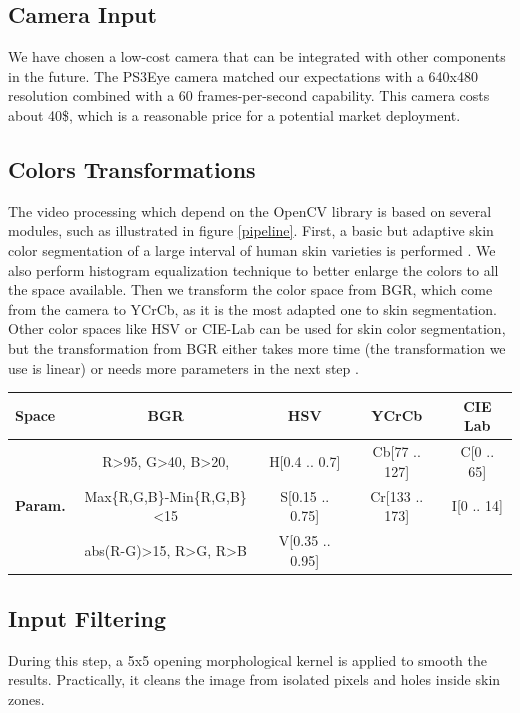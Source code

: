 \documentclass{llncs}
\begin{document}
\subsection{Camera Input}
We have chosen a low-cost camera that can be integrated with other components in the future.
The PS3Eye camera matched our expectations with a 640x480 resolution combined with a 60 frames-per-second capability.
This camera costs about 40\$, which is a reasonable price for a potential market deployment.

\subsection{Colors Transformations} %
The video processing which depend on the OpenCV library \cite{openCVlib} is based on several modules, such as illustrated in figure \ref{pipeline}.
First, a basic but adaptive skin color segmentation of a large interval of human skin varieties is performed \cite{skinColorSeg}.
We also perform histogram equalization technique to better enlarge the colors to all the space available.
Then we transform the color space from BGR, which come from the camera to YCrCb,
as it is the most adapted one to skin segmentation. Other color spaces like HSV or CIE-Lab can be used for skin color segmentation,
but the transformation from BGR either takes more time (the transformation we use is linear) or needs more parameters
in the next step \cite{skinColorSeg}.


\begin{center}
\begin{tabular}{|l|c|c|c|c|}
\hline
\textbf{Space} & BGR & HSV & YCrCb & CIE Lab\\
\hline
 & R\textgreater 95, G\textgreater 40, B\textgreater 20, & H[0.4 .. 0.7] & Cb[77 .. 127] & C[0 .. 65] \\
\textbf{Param.} & Max\{R,G,B\}-Min\{R,G,B\}\textless 15 & S[0.15 .. 0.75] & Cr[133 .. 173] & I[0 .. 14] \\
 & abs(R-G)\textgreater 15, R\textgreater G, R\textgreater B & V[0.35 .. 0.95] & & \\
\hline
\end{tabular}
\end{center}

\subsection{Input Filtering}
During this step, a 5x5 opening morphological kernel \cite{morphologicalAnalysis} is applied to smooth the results.
Practically, it cleans the image from isolated pixels and holes inside skin
zones.
\end{document}
